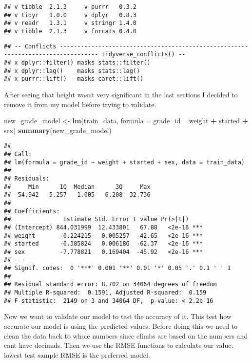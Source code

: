 \documentclass[]{article}
\newenvironment{Shaded}{\begin{snugshade}}{\end{snugshade}}
\newcommand{\DataTypeTok}[1]{\textcolor[rgb]{0.13,0.29,0.53}{#1}}
\newcommand{\KeywordTok}[1]{\textcolor[rgb]{0.13,0.29,0.53}{\textbf{#1}}}
\newcommand{\NormalTok}[1]{#1}
\newcommand{\OperatorTok}[1]{\textcolor[rgb]{0.81,0.36,0.00}{\textbf{#1}}}
\newcommand{\StringTok}[1]{\textcolor[rgb]{0.31,0.60,0.02}{#1}}
\begin{document}
\begin{verbatim}
## v tibble  2.1.3     v purrr   0.3.2
## v tidyr   1.0.0     v dplyr   0.8.3
## v readr   1.3.1     v stringr 1.4.0
## v tibble  2.1.3     v forcats 0.4.0
\end{verbatim}

\begin{verbatim}
## -- Conflicts --------------------------------------------------------------------------------- tidyverse_conflicts() --
## x dplyr::filter() masks stats::filter()
## x dplyr::lag()    masks stats::lag()
## x purrr::lift()   masks caret::lift()
\end{verbatim}

After seeing that height wasnt very significant in the last sections I
decided to remove it from my model before trying to validate.

\begin{Shaded}
\begin{Highlighting}[]
\NormalTok{new_grade_model <-}\StringTok{ }\KeywordTok{lm}\NormalTok{(train_data, }\DataTypeTok{formula =}\NormalTok{ grade_id }\OperatorTok{~}\StringTok{ }\NormalTok{weight }\OperatorTok{+}\StringTok{ }\NormalTok{started }\OperatorTok{+}\StringTok{ }\NormalTok{sex)}
\KeywordTok{summary}\NormalTok{(new_grade_model)}
\end{Highlighting}
\end{Shaded}

\begin{verbatim}
## 
## Call:
## lm(formula = grade_id ~ weight + started + sex, data = train_data)
## 
## Residuals:
##     Min      1Q  Median      3Q     Max 
## -54.942  -5.257   1.005   6.208  32.736 
## 
## Coefficients:
##               Estimate Std. Error t value Pr(>|t|)    
## (Intercept) 844.031999  12.433801   67.88   <2e-16 ***
## weight       -0.224215   0.005257  -42.65   <2e-16 ***
## started      -0.385824   0.006186  -62.37   <2e-16 ***
## sex          -7.778821   0.169404  -45.92   <2e-16 ***
## ---
## Signif. codes:  0 '***' 0.001 '**' 0.01 '*' 0.05 '.' 0.1 ' ' 1
## 
## Residual standard error: 8.702 on 34064 degrees of freedom
## Multiple R-squared:  0.1591, Adjusted R-squared:  0.159 
## F-statistic:  2149 on 3 and 34064 DF,  p-value: < 2.2e-16
\end{verbatim}

Now we want to validate our model to test the accuracy of it. This test
how accurate our model is using the predicted values. Before doing this
we need to clean the data back to whole numbers since climbs are based
on the numbers and cant have decimals. Then we use the RMSE functions to
calculate our value. lowest test sample RMSE is the preferred model.
\end{document}
